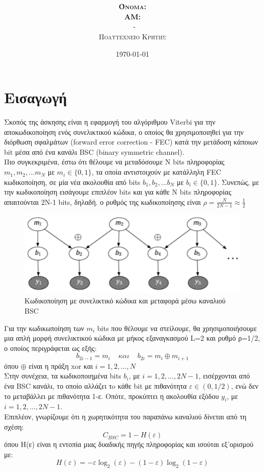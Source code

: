\documentclass{article}
\title{\underline{\textbf{\assignmentNumber}}}
\author{\textsc{\textbf{Όνομα:}}  \studentName\\
		\textsc{\textbf{ΑΜ:}}  \studentNumber\\
		\course \ - \courseName\\ 
		\textsc{Πολυτεχνείο Κρήτης}
}
\date{\today}
\begin{document}
	\maketitle
\section{Εισαγωγή}
Σκοπός της άσκησης είναι η εφαρμογή του αλγόριθμου Viterbi για την αποκωδικοποίηση ενός συνελικτικού κώδικα, ο οποίος θα χρησιμοποιηθεί για την
διόρθωση σφαλμάτων (forward error correction - FEC) κατά την μετάδοση κάποιων bit μέσα από ένα κανάλι BSC (binary symmetric channel). \\

\noindent
Πιο συγκεκριμένα, έστω ότι θέλουμε να μεταδόσουμε Ν  bits πληροφορίας $m_{1}, m_{2}, \dots m_{N}$ με $m_{i} \in \{0,1\}$, τα οποία αντιστοιχούν με κατάλληλη FEC
κωδικοποίηση, σε μία νέα ακολουθία από bits  $b_{1}, b_{2}, \dots b_{N}$ με $b_{i} \in \{0,1\}$. Συνεπώς, με την κωδικοποίηση εισάγουμε επιπλέον bits και για κάθε N bits πληροφορίας απαιτούνται 2Ν-1 bits, δηλαδή. ο ρυθμός της κωδικοποίησης είναι $ρ = \frac{N}{2N-1} \approx \frac{1}{2}$\\

\begin{figure}[h]
	\centering
	\includegraphics[width=0.5\linewidth]{./results/BSC_coding.png}
	\caption{Κωδικοποίηση με συνελικτικό κώδικα και μεταφορά μέσω καναλιού BSC}
\end{figure}
\noindent
Για την κωδικωποίηση των $m_{i}$ bits που θέλουμε να στείλουμε, θα χρησιμοποιήσουμε μια απλή μορφή συνελικτικού κώδικα με μήκος εξαναγκασμού L=2 και ρυθμό ρ=1/2, ο οποίος περιγράφεται ως εξής:
$$b_{2i-1} = m_{i} \ \ \ \ \ και \ \ \ \ \ b_{2i} = m_{i} \oplus m_{i+1} $$
όπου $\oplus$ είναι η πράξη xor και $i=1,2,\dots,N$\\

\noindent
Στην συνέχεια, τα κωδικοποιημένα bits $b_{i}$, με $i=1,2,\dots,2N-1$, εισέρχονται από ένα BSC κανάλι, το οποίο αλλάζει τo κάθε bit με πιθανότητα $ε \in (0,1/2)$, ενώ δεν το μεταβάλλει με πιθανότητα 1-ε. Οπότε, προκύπτει η ακολουθία εξόδου $y_{i}$, με $i=1,2,\dots,2N-1$. \\

\pagebreak
\noindent
Επιπλέον, γνωρίζουμε ότι η χωρητικότητα του παραπάνω καναλιού δίνεται από τη σχέση:
$$C_{BSC} = 1 - H(ε)$$
όπου H(ε) είναι η εντοπία μιας δυαδικής πηγής πληροφορίας και ισούται εξ'ορισμού με: 
$$H(ε) = -ε\log_{2}{(ε)} -(1-ε)\log_{2}{(1-ε)}$$
\end{document}
